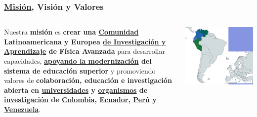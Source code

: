 \begin{frame}[fragile]
\frametitle{\underline{Misión}, Visión y Valores}
\begin{columns}[c] %

Nuestra {\bf\Large \color{LCredInst} misión} es {\bf \color{LCblueSec1} crear una \underline{Comunidad} Latinoamericana y Europea \underline{de Investigación y Aprendizaje} de Física Avanzada} para desarrollar capacidades, {\bf \color{logoyellow} \underline{apoyando la modernización} del sistema de educación superior} y promoviendo valores de {\bf \color{logobrown} colaboración, educación e investigación abierta en \underline{universidades} y \underline{organismos} de \underline{investigación} de \underline{Colombia}, \underline{Ecuador}, \underline{Perú} y \underline{Venezuela}}.


\begin{center}
\includegraphics[scale=0.05]{imagenes/mapa_conga_003.png}
\end{center}

\end{columns}



\end{frame}


